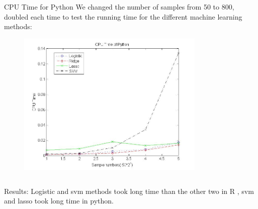 \documentclass[xcolor={x11names,svgnames,dvipsnames}]{beamer}
\begin{document}
\begin{frame}
\begin{columns}
\column{2.3in}
\begin{block}{CPU Time for Python}
We changed the number of samples from 50 to 800, doubled each time to test the running time for the different machine learning methods:\\
\begin{figure}
     \includegraphics[width=0.8\textwidth, height=0.5\textheight]{cputime_python.jpg}

    \end{figure}
\end{block}

\end{columns}

\begin{block}{Results:}
Logistic and svm methods took long time than the other two in R , svm and lasso took long time in python.\\

\end{block}


\end{frame}
\end{document}
